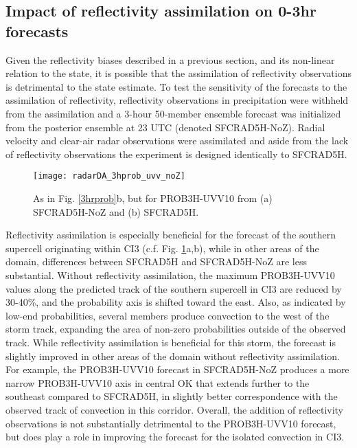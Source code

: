 \subsection{Impact of reflectivity assimilation on 0-3hr forecasts}
\label{section_zassim}
Given the reflectivity biases described in a previous section, and its non-linear relation to the state, it is possible that the assimilation of reflectivity observations is detrimental to the state estimate. To test the sensitivity of the forecasts to the assimilation of reflectivity, reflectivity observations in precipitation were withheld from the assimilation and a 3-hour 50-member ensemble forecast was initialized from the posterior ensemble at 23 UTC (denoted SFCRAD5H-NoZ). Radial velocity and clear-air radar observations were assimilated and aside from the lack of reflectivity observations the experiment is designed identically to SFCRAD5H.

\begin{figure}
\centering
\texttt{[image: radarDA\_3hprob\_uvv\_noZ]}
\caption{As in Fig. \ref{3hrprob}b, but for PROB3H-UVV10 from (a) SFCRAD5H-NoZ and (b) SFCRAD5H.}
\label{probuvvnoZ}
\end{figure}

Reflectivity assimilation is especially beneficial for the forecast of the southern supercell originating within CI3 (c.f. Fig. \ref{probuvvnoZ}a,b), while in other areas of the domain, differences between SFCRAD5H and SFCRAD5H-NoZ are less substantial. Without reflectivity assimilation, the maximum PROB3H-UVV10 values along the predicted track of the southern supercell in CI3 are reduced by 30-40\%, and the probability axis is shifted toward the east. Also, as indicated by low-end probabilities, several members produce convection to the west of the storm track, expanding the area of non-zero probabilities outside of the observed track. While reflectivity assimilation is beneficial for this storm, the forecast is slightly improved in other areas of the domain without reflectivity assimilation. For example, the PROB3H-UVV10 forecast in SFCRAD5H-NoZ produces a more narrow PROB3H-UVV10 axis in central OK that extends further to the southeast compared to SFCRAD5H, in slightly better correspondence with the observed track of convection in this corridor. Overall, the addition of reflectivity observations is not substantially detrimental to the PROB3H-UVV10 forecast, but does play a role in improving the forecast for the isolated convection in CI3.

